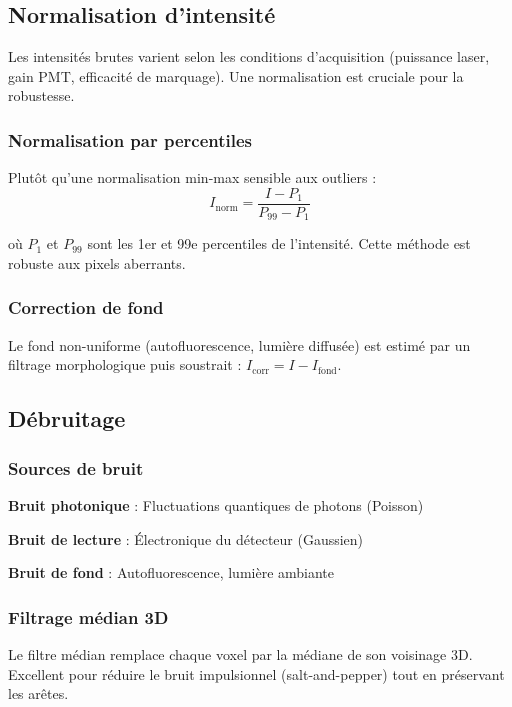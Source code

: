 \subsection{Normalisation d'intensité}

Les intensités brutes varient selon les conditions d'acquisition (puissance laser, gain PMT, efficacité de marquage). Une normalisation est cruciale pour la robustesse.

\subsubsection{Normalisation par percentiles}

Plutôt qu'une normalisation min-max sensible aux outliers :
\[
I_{\text{norm}} = \frac{I - P_1}{P_{99} - P_1}
\]

où $P_1$ et $P_{99}$ sont les 1er et 99e percentiles de l'intensité. Cette méthode est robuste aux pixels aberrants.

\subsubsection{Correction de fond}

Le fond non-uniforme (autofluorescence, lumière diffusée) est estimé par un filtrage morphologique puis soustrait : $I_{\text{corr}} = I - I_{\text{fond}}$.

\subsection{Débruitage}

\subsubsection{Sources de bruit}

\textbf{Bruit photonique} : Fluctuations quantiques de photons (Poisson)

\textbf{Bruit de lecture} : Électronique du détecteur (Gaussien)

\textbf{Bruit de fond} : Autofluorescence, lumière ambiante

\subsubsection{Filtrage médian 3D}

Le filtre médian remplace chaque voxel par la médiane de son voisinage 3D. Excellent pour réduire le bruit impulsionnel (salt-and-pepper) tout en préservant les arêtes.


